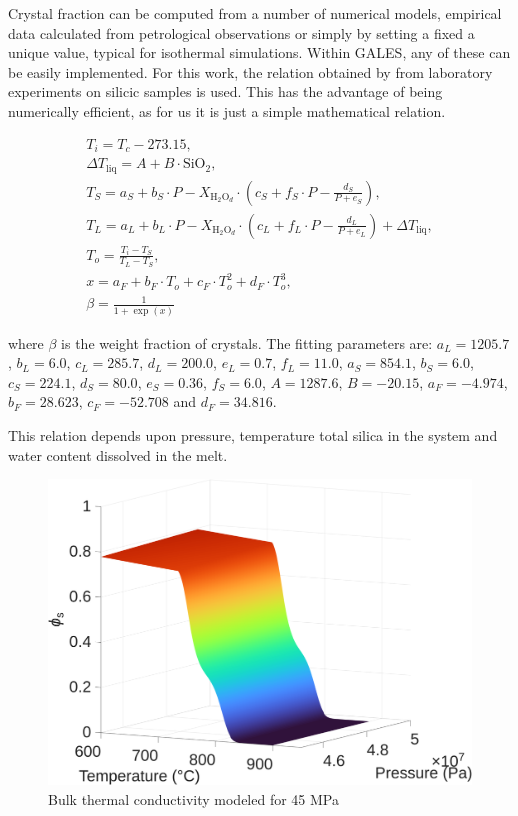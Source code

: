 Crystal fraction can be computed from a number of numerical models, empirical data calculated from petrological observations or simply by setting a fixed a unique value, typical for isothermal simulations. Within GALES, any of these can be easily implemented. For this work, the relation obtained by \cite{abdullin2024} from laboratory experiments on silicic samples is used. This has the advantage of being numerically efficient, as for us it is just a simple mathematical relation.

\begin{equation}
	\begin{aligned}
		T_i = T_c - 273.15, \\ 
		\Delta T_{\text{liq}} = A + B \cdot \text{SiO}_2, \\
		T_S = a_S + b_S \cdot P - X_{\text{H}_2\text{O}_d} \cdot \left(c_S + f_S \cdot P - \frac{d_S}{P + e_S} \right),\\
		T_L = a_L + b_L \cdot P - X_{\text{H}_2\text{O}_d} \cdot \left(c_L + f_L \cdot P - \frac{d_L}{P + e_L} \right) + \Delta T_{\text{liq}}, \\
		T_o = \frac{T_i - T_S}{T_L - T_S}, \\
		x = a_F + b_F \cdot T_o + c_F \cdot T_o^2 + d_F \cdot T_o^3, \\
		\beta = \frac{1}{1 + \exp(x)}
	\end{aligned}
\end{equation}

where $\beta$ is the weight fraction of crystals. The fitting parameters are: 
\( a_L = 1205.7 \), \( b_L = 6.0 \), \( c_L = 285.7 \), \( d_L = 200.0 \), \( e_L = 0.7 \), \( f_L = 11.0 \), \( a_S = 854.1 \), \( b_S = 6.0 \), \( c_S = 224.1 \), \( d_S = 80.0 \), \( e_S = 0.36 \), \( f_S = 6.0 \), \( A = 1287.6 \), \( B = -20.15 \), \( a_F = -4.974 \), \( b_F = 28.623 \), \( c_F = -52.708 \) and \( d_F = 34.816 \).

This relation depends upon pressure, temperature total silica in the system and water content dissolved in the melt.

\begin{figure}
	\centering
	\includegraphics[width=1\linewidth]{img/chapter2/properties/vf_s/vf_s_3D.png}
	\caption{Bulk thermal conductivity modeled for 45 MPa}
	\label{fig:volume_crystals}
\end{figure}


